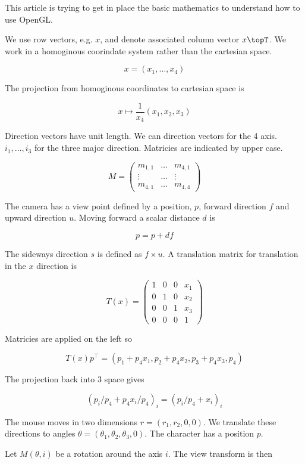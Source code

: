 \documentclass[12pt]{article}
\begin{document}
This article is trying to get in place the basic mathematics to
understand how to use OpenGL.

We use row vectors, e.g. $x$, and denote associated column vector
$x\topT$. We work in a homoginous coorindate system rather than the
cartesian space.

\[
   x = (x_1,\dots,x_4)
\]

The projection from homoginous coordinates to cartesian space is

\[
   x \mapsto \frac{1}{x_4}(x_1, x_2, x_3)
\]

Direction vectors have unit length. We can direction vectors for the 4
axis. $i_1,\dots,i_3$ for the three major direction. Matricies
are indicated by upper case.

\[
   M = \left ( \begin{array}{ccc}
     m_{1,1} & \dots & m_{4,1}  \\
     \vdots & \dots & \vdots  \\
     m_{4,1} & \dots & m_{4,4}
     \end{array}
   \right )
\]

The camera has a view point defined by a position, $p$,
forward direction $f$ and upward direction $u$. Moving
forward a scalar distance $d$ is

\[
   p = p + df
\]

The sideways direction $s$ is defined as $f \times u$. A translation
matrix for translation in the $x$ direction is

\[
  T(x) = \left ( 
  \begin{array}{cccc}
     1 & 0 & 0 & x_1      \\
     0 & 1 & 0 & x_2      \\
     0 & 0 & 1 & x_3      \\
     0 & 0 & 0 & 1
  \end{array}
  \right )
\]

Matricies are applied on the left so

\[
  T(x) p^\top = (p_1 + p_4 x_1, p_2 + p_4 x_2, p_3 + p_4 x_3, p_4)
\]

The projection back into 3 space gives

\[
  (p_i / p_4 + p_4 x_i / p_4)_{i} = (p_i/p_4 + x_i)_{i}
\]

The mouse moves in two dimensions $r = (r_1, r_2, 0, 0)$. We translate
these directions to angles $\theta = (\theta_1, \theta_2, \theta_3, 0)$. The
character has a position $p$.

Let $M(\theta, i)$ be a rotation around the axis $i$. The view
transform is then
\end{document}
